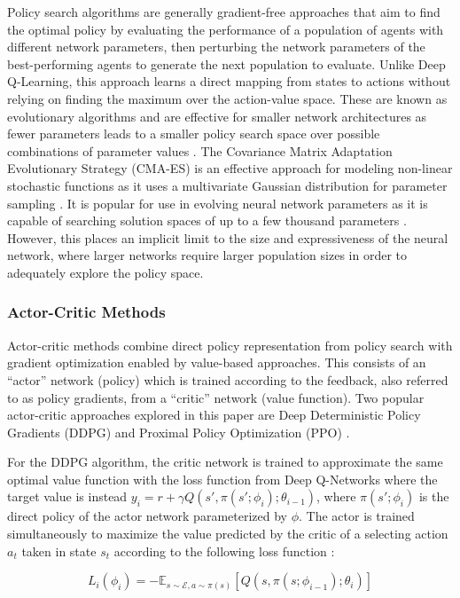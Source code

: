 Policy search algorithms are generally gradient-free approaches that aim to find the optimal policy by evaluating the performance of a population of agents with different network parameters, then perturbing the network parameters of the best-performing agents to generate the next population to evaluate. Unlike Deep Q-Learning, this approach learns a direct mapping from states to actions without relying on finding the maximum over the action-value space. These are known as evolutionary algorithms and are effective for smaller network architectures as fewer parameters leads to a smaller policy search space over possible combinations of parameter values \cite{2.0}. The Covariance Matrix Adaptation Evolutionary Strategy (CMA-ES) is an effective approach for modeling non-linear stochastic functions as it uses a multivariate Gaussian distribution for parameter sampling \cite{1.0.3}. It is popular for use in evolving neural network parameters as it is capable of searching solution spaces of up to a few thousand parameters \cite{1.0.0}. However, this places an implicit limit to the size and expressiveness of the neural network, where larger networks require larger population sizes in order to adequately explore the policy space.

\subsubsection{Actor-Critic Methods}

Actor-critic methods combine direct policy representation from policy search with gradient optimization enabled by value-based approaches. This consists of an ``actor'' network (policy) which is trained according to the feedback, also referred to as policy gradients, from a ``critic'' network (value function). Two popular actor-critic approaches explored in this paper are Deep Deterministic Policy Gradients (DDPG) \cite{2.2} and Proximal Policy Optimization (PPO) \cite{2.3}. 

For the DDPG algorithm, the critic network is trained to approximate the same optimal value function with the loss function from Deep Q-Networks where the target value is instead $y_i = r + \gamma Q(s',\pi(s';\phi_i);\theta_{i-1})$, where $\pi(s';\phi_i)$ is the direct policy of the actor network parameterized by $\phi$. The actor is trained simultaneously to maximize the value predicted by the critic of a selecting action $a_t$ taken in state $s_t$ according to the following loss function \cite{2.2}:

\begin{dmath}
	L_i(\phi_i) = -\mathbb{E}_{s \sim \mathcal{E}, a \sim \pi(s)} \left[ Q(s,\pi(s;\phi_{i-1});\theta_i) \right]
\end{dmath}

